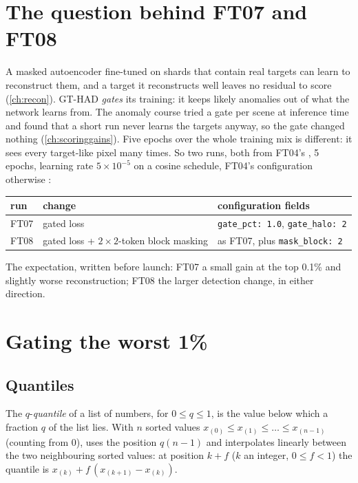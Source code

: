 \section{The question behind FT07 and FT08}\label{sec:decoderwork:question}

A masked autoencoder fine-tuned on shards that contain real targets can learn to reconstruct them, and a
target it reconstructs well leaves no residual to score (\cref{ch:recon}). GT-HAD \citep{lian2025gated}
\emph{gates} its training: it keeps likely anomalies out of what the network learns from. The anomaly
course tried a gate per scene at inference time and found that a short run never learns the targets anyway,
so the gate changed nothing (\cref{ch:scoringgains}). Five epochs over the whole training mix is different: it
sees every target-like pixel many times. So two runs, both from FT04's , 5 epochs, learning rate
$5\times10^{-5}$ on a cosine schedule, FT04's configuration otherwise
:

\begin{center}
\begin{tabular}{lll}
\toprule
run & change & configuration fields\\
\midrule
FT07 & gated loss & \texttt{gate\_pct: 1.0}, \texttt{gate\_halo: 2}\\
FT08 & gated loss + $2\times2$-token block masking & as FT07, plus \texttt{mask\_block: 2}\\
\bottomrule
\end{tabular}
\end{center}

The expectation, written before launch: FT07 a small gain at the top 0.1\% and slightly worse reconstruction;
FT08 the larger detection change, in either direction.

\section{Gating the worst 1\%}\label{sec:decoderwork:gate}

\subsection{Quantiles}

\begin{definition}[Quantile]
The $q$-\emph{quantile} of a list of numbers, for $0\le q\le 1$, is the value below which a
fraction $q$ of the list lies. With $n$ sorted values $x_{(0)}\le x_{(1)}\le\dots\le x_{(n-1)}$ (counting from
0),  uses the position $q(n-1)$ and interpolates linearly between the two neighbouring
sorted values: at position $k+f$ ($k$ an integer, $0\le f<1$) the quantile is $x_{(k)}+f\,(x_{(k+1)}-x_{(k)})$.
\end{definition}

